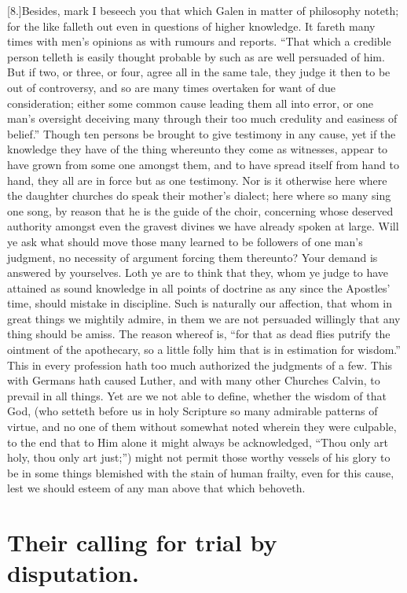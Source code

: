 [8.]Besides, mark I beseech you that which Galen in matter of philosophy noteth; for the like falleth out even in questions of higher knowledge. It fareth many times with men’s opinions as with rumours and reports. “That which a credible person telleth is easily thought probable by such as are well persuaded of him. But if two, or three, or four, agree all in the same tale, they judge it then to be out of controversy, and so are many times overtaken for want of due consideration; either some common cause leading them all into error, or one man’s oversight deceiving many through their too much credulity and easiness of belief.” Though ten persons be brought to give testimony in any cause, yet if the knowledge they have of the thing whereunto they come as witnesses, appear to have grown from some one amongst them, and to have spread itself from hand to hand, they all are in force but as one testimony. Nor is it otherwise here where the daughter churches do speak their mother’s dialect; here where so many sing one song, by reason that he is the guide of the choir, concerning whose deserved authority amongst even the gravest divines we have already spoken at large. Will ye ask what should move those many learned to be followers of one man’s judgment, no necessity of argument forcing them thereunto? Your demand is answered by yourselves. Loth ye are to think that they, whom ye judge to have attained as sound knowledge in all points of doctrine as any since the Apostles’ time, should mistake in discipline. Such is naturally our affection, that whom in great things we mightily admire, in them we are not persuaded willingly that any thing should be amiss. The reason whereof is, “for that as dead flies putrify the ointment of the apothecary, so a little folly him that is in estimation for wisdom.” This in every profession hath too much authorized the judgments of a few. This with Germans hath caused Luther, and with many other Churches Calvin, to prevail in all things. Yet are we not able to define, whether the wisdom of that God, (who setteth before us in holy Scripture so many admirable patterns of virtue, and no one of them without somewhat noted wherein they were culpable, to the end that to Him alone it might always be acknowledged, “Thou only art holy, thou only art just;”) might not permit those worthy vessels of his glory to be in some things blemished with the stain of human frailty, even for this cause, lest we should esteem of any man above that which behoveth.

\section*{Their calling for trial by disputation.}

